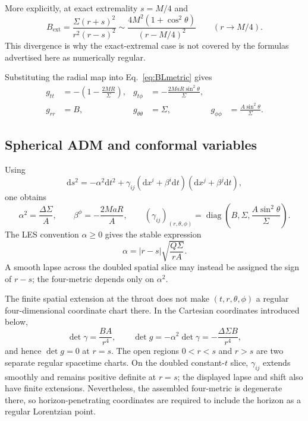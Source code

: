 \documentclass[11pt]{article}
\newcommand{\dd}{\mathrm{d}}
\newcommand{\RBL}{R}
\begin{document}
More explicitly, at exact extremality $s=M/4$ and
\begin{equation}
 B_{\mathrm{ext}}=
 \frac{\Sigma(r+s)^2}{r^2(r-s)^2}
 \sim
 \frac{4M^2(1+\cos^2\theta)}{(r-M/4)^2}
 \qquad (r\to M/4). \label{eq:Bextremal}
\end{equation}
This divergence is why the exact-extremal case is not covered by the formulas advertised here as numerically regular.

Substituting the radial map into Eq.~\eqref{eq:BLmetric} gives
\begin{equation}
 \boxed{
 \begin{aligned}
 g_{tt}&=-\left(1-\frac{2M\RBL}{\Sigma}\right),
 &g_{t\phi}&=-\frac{2Ma\RBL\sin^2\theta}{\Sigma},\\
 g_{rr}&=B,
 &g_{\theta\theta}&=\Sigma,
 &g_{\phi\phi}&=\frac{A\sin^2\theta}{\Sigma}.
 \end{aligned}} \label{eq:sphericalcomponents}
\end{equation}

\subsection{Spherical ADM and conformal variables}

Using
\begin{equation}
 \dd s^2=-\alpha^2\dd t^2
 +\gamma_{ij}(\dd x^i+\beta^i\dd t)(\dd x^j+\beta^j\dd t), \label{eq:ADMline}
\end{equation}
one obtains
\begin{equation}
 \boxed{
 \alpha^2=\frac{\Delta\Sigma}{A},\qquad
 \beta^\phi=-\frac{2Ma\RBL}{A},\qquad
 (\gamma_{ij})_{(r,\theta,\phi)}=
 \operatorname{diag}\!\left(B,\Sigma,\frac{A\sin^2\theta}{\Sigma}\right).} \label{eq:ADMspherical}
\end{equation}
The LES convention $\alpha\geq0$ gives the stable expression
\begin{equation}
 \alpha=|r-s|\sqrt{\frac{Q\Sigma}{rA}}. \label{eq:lapsestable}
\end{equation}
A smooth lapse across the doubled spatial slice may instead be assigned the sign of $r-s$; the four-metric depends only on $\alpha^2$.

The finite spatial extension at the throat does not make $(t,r,\theta,\phi)$ a regular four-dimensional coordinate chart there. In the Cartesian coordinates introduced below,
\begin{equation}
 \det\gamma=\frac{BA}{r^4},\qquad
 \det g=-\alpha^2\det\gamma=-\frac{\Delta\Sigma B}{r^4}, \label{eq:determinants}
\end{equation}
and hence $\det g=0$ at $r=s$. The open regions $0<r<s$ and $r>s$ are two separate regular spacetime charts. On the doubled constant-$t$ slice, $\gamma_{ij}$ extends smoothly and remains positive definite at $r=s$; the displayed lapse and shift also have finite extensions. Nevertheless, the assembled four-metric is degenerate there, so horizon-penetrating coordinates are required to include the horizon as a regular Lorentzian point.
\end{document}
